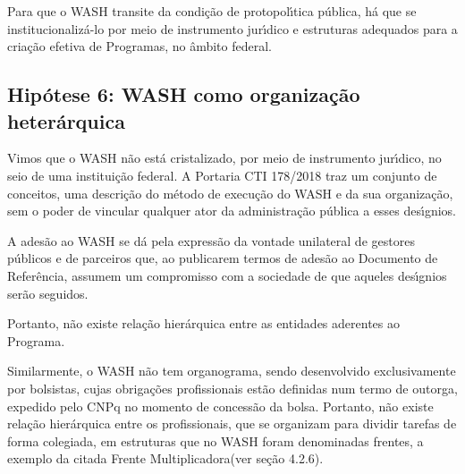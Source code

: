 \documentclass[
12pt,		%
openright,	%
twoside,  %
a4paper,			%
chapter=TITLE,		%
english,			%
french,				%
spanish,			%
brazil				%
]{USPSC-classe/USPSC}
\begin{document}
Para que o WASH transite da condi\c{c}\~ao de protopol\'{\i}tica p\'ublica, h\'a que se institucionaliz\'a-lo por meio de instrumento jur\'{\i}dico e estruturas  adequados para a cria\c{c}\~ao efetiva de Programas, no \^ambito federal.









\subsection[Hip\'otese 6: WASH como organiza\c{c}\~ao heter\'arquica]{Hip\'otese 6: WASH como organiza\c{c}\~ao heter\'arquica}\label{Hip\'otese 6: WASH como organiza\c{c}\~ao heter\'arquica}
Vimos que o WASH n\~ao est\'a cristalizado, por meio de instrumento jur\'{\i}dico, no seio de uma institui\c{c}\~ao federal. A Portaria CTI 178/2018 traz um conjunto de conceitos, uma descri\c{c}\~ao do m\'etodo de execu\c{c}\~ao do WASH e da sua organiza\c{c}\~ao, sem o poder de vincular qualquer ator da administra\c{c}\~ao p\'ublica a esses des\'{\i}gnios.









A ades\~ao ao WASH se d\'a pela express\~ao da vontade unilateral de gestores p\'ublicos e de parceiros que, ao publicarem termos de ades\~ao ao Documento de Refer\^encia, assumem um compromisso com a sociedade de que aqueles des\'{\i}gnios ser\~ao seguidos.









Portanto, n\~ao existe rela\c{c}\~ao hier\'arquica entre as entidades aderentes ao \textquotedbl Programa\textquotedbl .









Similarmente, o WASH n\~ao tem organograma, sendo desenvolvido exclusivamente por bolsistas, cujas obriga\c{c}\~oes profissionais est\~ao definidas num termo de outorga, expedido pelo CNPq no momento de concess\~ao da bolsa. Portanto, n\~ao existe rela\c{c}\~ao hier\'arquica entre os profissionais, que se organizam para dividir tarefas de forma colegiada, em estruturas que no WASH foram denominadas \textquotedbl frentes\textquotedbl , a exemplo da citada \textquotedbl Frente Multiplicadora\textquotedbl  (ver se\c{c}\~ao 4.2.6).
\end{document}
